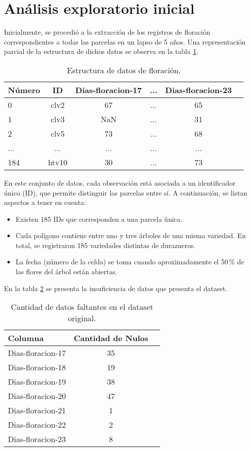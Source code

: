\section{Análisis exploratorio inicial}

Inicialmente, se procedió a la extracción de los registros de floración correspondientes 
a todas las parcelas en un lapso de 5 años. Una representación parcial de la 
estructura de dichos datos se observa en la tabla \ref{tab:firstdataset}.

	\begin{table}[h]
		\centering
		\caption{Estructura de datos de floración.}
		\begin{tabular}{l c c c c c}    
			\toprule
			\textbf{Número} & \textbf{ID} & \textbf{Dias-floracion-17} & \textbf{...} & \textbf{Dias-floracion-23} \\
			\midrule
			0 & clv2 & 67 & ... & 65 \\		
			1 & clv3 & NaN & ... & 31 \\
			2 & clv5 & 73 & ... & 68 \\
      ... & ... & ... & ... & ... \\
      184 & htv10 & 30 & ... & 73 \\
			\bottomrule
		\end{tabular}
		\label{tab:firstdataset}
	\end{table}

  En este conjunto de datos, cada observación está asociada a un identificador único (ID), que permite distinguir las parcelas entre sí.  
  A continuación, se listan aspectos a tener en cuenta:
\begin{itemize}
  \item Existen 185 IDs que corresponden a una parcela única.
  \item Cada polígono contiene entre uno y tres árboles de una misma variedad. En total, se registraron 185 variedades distintas de durazneros.
  \item La fecha (número de la celda) se toma cuando aproximadamente el 50\,\% de las flores del árbol están abiertas. 
 \end{itemize} 

En la tabla \ref{tab:nullsdataset} se presenta la insuficiencia de datos que presenta el dataset.

\begin{table}[h]
  \centering
  \caption{Cantidad de datos faltantes en el dataset original.}
  \begin{tabular}{l c c}    
    \toprule
     \textbf{Columna} & \textbf{Cantidad de Nulos} \\
    \midrule
    Dias-floracion-17 & 35 \\		
    Dias-floracion-18	 & 19  \\
    Dias-floracion-19	& 38  \\
    Dias-floracion-20	 & 47 \\
    Dias-floracion-21	 & 1 \\
    Dias-floracion-22	 & 2 \\
    Dias-floracion-23	 & 8 \\
    \bottomrule
  \end{tabular}
  \label{tab:nullsdataset}
\end{table}


